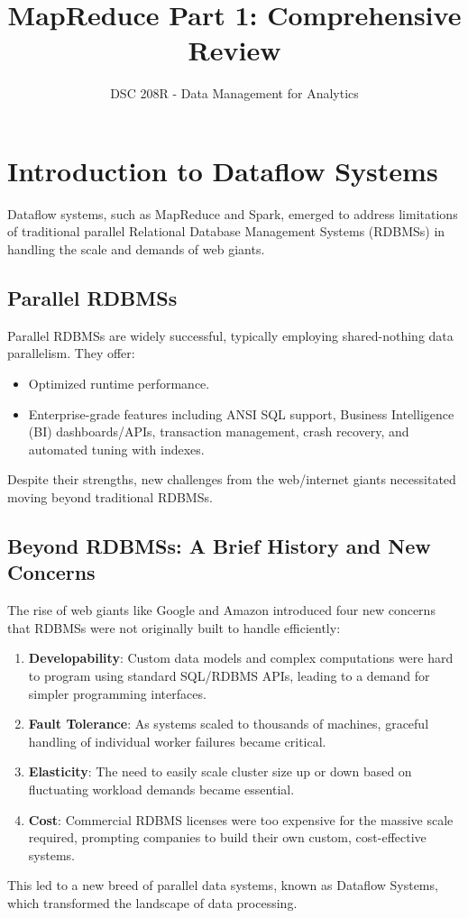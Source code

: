 \documentclass{article}
\title{MapReduce Part 1: Comprehensive Review}
\author{DSC 208R - Data Management for Analytics}
\date{}
\begin{document}
\maketitle

\section*{Introduction to Dataflow Systems}
Dataflow systems, such as MapReduce and Spark, emerged to address limitations of traditional parallel Relational Database Management Systems (RDBMSs) in handling the scale and demands of web giants.

\subsection*{Parallel RDBMSs}
Parallel RDBMSs are widely successful, typically employing shared-nothing data parallelism. They offer:
\begin{itemize}
    \item Optimized runtime performance.
    \item Enterprise-grade features including ANSI SQL support, Business Intelligence (BI) dashboards/APIs, transaction management, crash recovery, and automated tuning with indexes.
\end{itemize}
Despite their strengths, new challenges from the web/internet giants necessitated moving beyond traditional RDBMSs.

\subsection*{Beyond RDBMSs: A Brief History and New Concerns}
The rise of web giants like Google and Amazon introduced four new concerns that RDBMSs were not originally built to handle efficiently:
\begin{enumerate}
    \item \textbf{Developability}: Custom data models and complex computations were hard to program using standard SQL/RDBMS APIs, leading to a demand for simpler programming interfaces.
    \item \textbf{Fault Tolerance}: As systems scaled to thousands of machines, graceful handling of individual worker failures became critical.
    \item \textbf{Elasticity}: The need to easily scale cluster size up or down based on fluctuating workload demands became essential.
    \item \textbf{Cost}: Commercial RDBMS licenses were too expensive for the massive scale required, prompting companies to build their own custom, cost-effective systems.
\end{enumerate}
This led to a new breed of parallel data systems, known as Dataflow Systems, which transformed the landscape of data processing.
\end{document}
